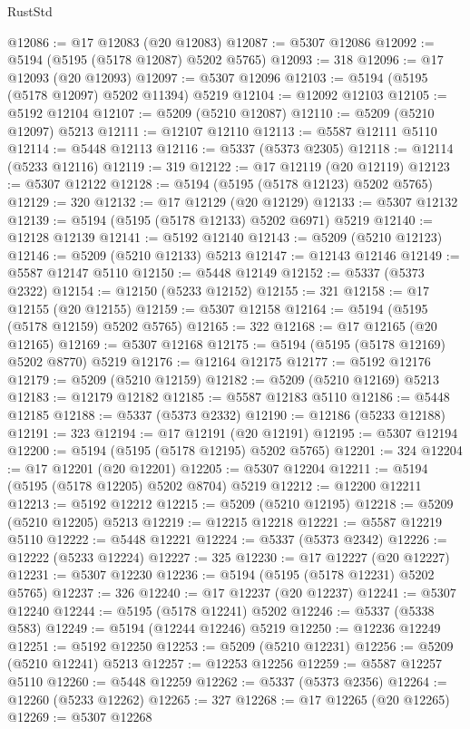 \begin{lexlean}{RustStd}
\begin{coremodule}
@12086 := @17 @12083 (@20 @12083)
@12087 := @5307 @12086
@12092 := @5194 (@5195 (@5178 @12087) @5202 @5765)
@12093 := 318
@12096 := @17 @12093 (@20 @12093)
@12097 := @5307 @12096
@12103 := @5194 (@5195 (@5178 @12097) @5202 @11394) @5219
@12104 := @12092 @12103
@12105 := @5192 @12104
@12107 := @5209 (@5210 @12087)
@12110 := @5209 (@5210 @12097) @5213
@12111 := @12107 @12110
@12113 := @5587 @12111 @5110
@12114 := @5448 @12113
@12116 := @5337 (@5373 @2305)
@12118 := @12114 (@5233 @12116)
@12119 := 319
@12122 := @17 @12119 (@20 @12119)
@12123 := @5307 @12122
@12128 := @5194 (@5195 (@5178 @12123) @5202 @5765)
@12129 := 320
@12132 := @17 @12129 (@20 @12129)
@12133 := @5307 @12132
@12139 := @5194 (@5195 (@5178 @12133) @5202 @6971) @5219
@12140 := @12128 @12139
@12141 := @5192 @12140
@12143 := @5209 (@5210 @12123)
@12146 := @5209 (@5210 @12133) @5213
@12147 := @12143 @12146
@12149 := @5587 @12147 @5110
@12150 := @5448 @12149
@12152 := @5337 (@5373 @2322)
@12154 := @12150 (@5233 @12152)
@12155 := 321
@12158 := @17 @12155 (@20 @12155)
@12159 := @5307 @12158
@12164 := @5194 (@5195 (@5178 @12159) @5202 @5765)
@12165 := 322
@12168 := @17 @12165 (@20 @12165)
@12169 := @5307 @12168
@12175 := @5194 (@5195 (@5178 @12169) @5202 @8770) @5219
@12176 := @12164 @12175
@12177 := @5192 @12176
@12179 := @5209 (@5210 @12159)
@12182 := @5209 (@5210 @12169) @5213
@12183 := @12179 @12182
@12185 := @5587 @12183 @5110
@12186 := @5448 @12185
@12188 := @5337 (@5373 @2332)
@12190 := @12186 (@5233 @12188)
@12191 := 323
@12194 := @17 @12191 (@20 @12191)
@12195 := @5307 @12194
@12200 := @5194 (@5195 (@5178 @12195) @5202 @5765)
@12201 := 324
@12204 := @17 @12201 (@20 @12201)
@12205 := @5307 @12204
@12211 := @5194 (@5195 (@5178 @12205) @5202 @8704) @5219
@12212 := @12200 @12211
@12213 := @5192 @12212
@12215 := @5209 (@5210 @12195)
@12218 := @5209 (@5210 @12205) @5213
@12219 := @12215 @12218
@12221 := @5587 @12219 @5110
@12222 := @5448 @12221
@12224 := @5337 (@5373 @2342)
@12226 := @12222 (@5233 @12224)
@12227 := 325
@12230 := @17 @12227 (@20 @12227)
@12231 := @5307 @12230
@12236 := @5194 (@5195 (@5178 @12231) @5202 @5765)
@12237 := 326
@12240 := @17 @12237 (@20 @12237)
@12241 := @5307 @12240
@12244 := @5195 (@5178 @12241) @5202
@12246 := @5337 (@5338 @583)
@12249 := @5194 (@12244 @12246) @5219
@12250 := @12236 @12249
@12251 := @5192 @12250
@12253 := @5209 (@5210 @12231)
@12256 := @5209 (@5210 @12241) @5213
@12257 := @12253 @12256
@12259 := @5587 @12257 @5110
@12260 := @5448 @12259
@12262 := @5337 (@5373 @2356)
@12264 := @12260 (@5233 @12262)
@12265 := 327
@12268 := @17 @12265 (@20 @12265)
@12269 := @5307 @12268

\end{coremodule}
\end{lexlean}
